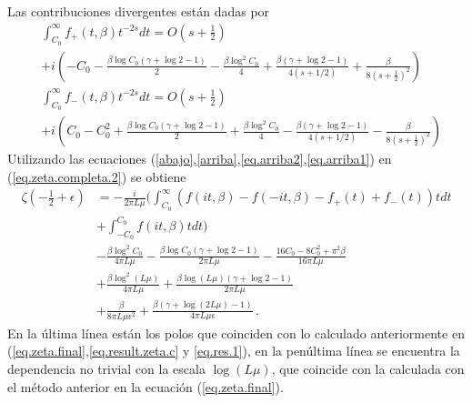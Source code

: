 Las contribuciones divergentes están dadas por
\begin{align}
\label{arriba}
&
	\int _{C _0} ^{\infty}
			f _{+} (t, \beta )			
			 t ^{-2s} dt =  
	O \left( s + \frac{1}{2} \right)
\\[5pt]
\nonumber			
&+
	i \left(- C _0 
		    - \frac{\beta \log C_0 (\gamma + \log 2 - 1 ) 
		    		}{2} 
		    - \frac{\beta \log ^2 C _0}{4}
		    + \frac{\beta ( \gamma + \log 2 -1 )}{4 (s + 1/2)} 
		    + \frac{\beta}{8 (s + \frac{1}{2}) ^2}
					\right)
\\[5pt]
\label{abajo}
&
	\int _{C _0} ^{\infty}
			f _{-} ( t, \beta)
			 t ^{-2s} dt =
	O \left(s + \frac{1}{2} \right)
\\[5pt]
\nonumber
&+
	i \left(C _0 
			- C _0 ^2
		    + \frac{\beta \log C_0 (\gamma + \log 2 - 1 ) 
		    		}{2} 
		    + \frac{\beta \log ^2 C _0}{4}
		    - \frac{\beta ( \gamma + \log 2 -1 )}{4 (s + 1/2)} 
		    - \frac{\beta}{8 (s + \frac{1}{2}) ^2}
					\right)
\end{align}
Utilizando las ecuaciones (\ref{abajo},\ref{arriba},\ref{eq.arriba2},\ref{eq.arriba1}) en (\ref{eq.zeta.completa.2}) se obtiene
\begin{align}
\zeta \left( - \frac{1}{2}  + \epsilon \right) &=
- \frac{i}{2 \pi L \mu} 
\Bigg(	  
		 \int _{C _0} ^{\infty}
			\left(
					f (i t,\beta )
					- f (-i t,\beta )
					- f _{+} (t) 
					+ f _{-} (t)
					\right)
			t   dt   \nonumber
\\ \nonumber
&+
		 \int _{- C _0} ^{C _0}
			f (i t,\beta )
			t   dt 	
	\Bigg)
\\ \nonumber
&
	- \frac{\beta \log ^2 C _0}{4 \pi L \mu}
	- \frac{\beta \log C _0 (\gamma + \log 2 -1 )}{2 \pi L \mu} 
	- \frac{16 C_0 - 8 C _0 ^2 + \pi ^2 \beta}{16 \pi L \mu}
\\ \nonumber
&
	+\frac{\beta \log ^2 (L \mu )}{4 \pi L \mu} 
	+ \frac{\beta \log  (L \mu) (\gamma + \log 2 -1)}{2 \pi L \mu}
\\ 
&	+ \frac{\beta}
		 {8 \pi L \mu  \epsilon ^2} +
	\frac{\beta (\gamma + \log (2 L \mu) -1 ) }
		 {4 \pi L \mu  \epsilon } 
\, .
\end{align}
En la última línea están los polos que coinciden con lo calculado anteriormente en (\ref{eq.zeta.final},\ref{eq.result.zeta.c} y \ref{eq.res.1}), en la penúltima línea se encuentra la dependencia no trivial con la escala $\log (L \mu)$, que coincide con la calculada con el método anterior en la ecuación (\ref{eq.zeta.final}).

